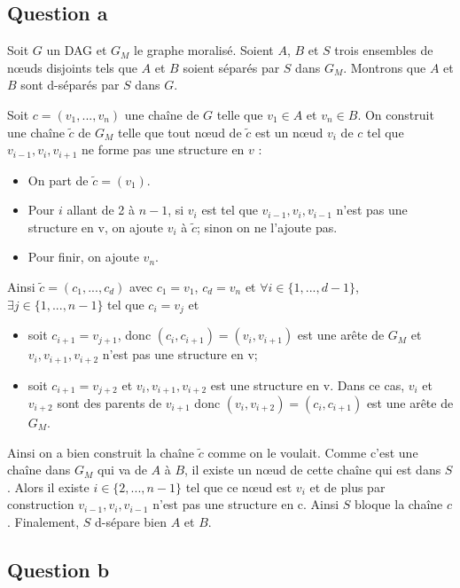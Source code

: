 \documentclass{article}
\begin{document}
\subsection{Question a}

Soit $G$ un DAG et $G_M$ le graphe moralisé. Soient $A$, $B$ et $S$ trois
ensembles de nœuds disjoints tels que $A$ et $B$ soient séparés par $S$ dans
$G_M$. Montrons que $A$ et $B$ sont d-séparés par $S$ dans $G$.

Soit $c = (v_{1}, ..., v_{n})$ une chaîne de $G$ telle que $v_{1} \in A$ et
$v_{n} \in B$. On construit une chaîne $\tilde{c}$ de $G_M$ telle que tout
nœud de $\tilde{c}$ est un nœud $v_i$ de $c$ tel que $v_{i-1},v_{i},v_{i+1}$
ne forme pas une structure en $v$ :

\begin{itemize}
  \item On part de $\tilde{c}=(v_{1})$.
  \item Pour  $i$ allant de 2 à $n-1$, si $v_i$ est tel que
  $v_{i-1},v_{i},v_{i-1}$ n'est pas une structure en v, on ajoute $v_i$ à
  $\tilde{c}$; sinon on ne l'ajoute pas.
  \item Pour finir, on ajoute $v_{n}$. 
\end{itemize}

Ainsi $\tilde{c} = (c_{1}, ..., c_{d})$ avec $c_1 = v_1$, $c_d = v_n$ et
$\forall i \in \{1,...,d-1\}$, $\exists j \in \{1,...,n-1\}$ tel que $c_i =
v_j$ et 

\begin{itemize}
  \item soit $c_{i+1} = v_{j+1}$, donc $(c_{i},c_{i+1})=(v_{i},v_{i+1})$ est
  une arête de $G_M$ et $v_{i},v_{i+1},v_{i+2}$ n'est pas une structure en v;
  \item soit $c_{i+1} = v_{j+2}$ et $v_{i},v_{i+1},v_{i+2}$ est une structure
  en v. Dans ce cas, $v_{i}$ et $v_{i+2}$ sont des parents de $v_{i+1}$ donc
  $(v_{i},v_{i+2})=(c_{i},c_{i+1})$ est une arête de $G_M$.
\end{itemize}

Ainsi on a bien construit la chaîne $\tilde{c}$ comme on le voulait. Comme
c'est une chaîne dans $G_M$ qui va de $A$ à $B$, il existe un nœud de cette
chaîne qui est dans $S$. Alors il existe $i\in \{2,...,n-1\}$ tel que ce nœud
est $v_i$ et de plus par construction $v_{i-1},v_{i},v_{i-1}$ n'est pas une
structure en c. Ainsi $S$ bloque la chaîne $c$. Finalement, $S$ d-sépare bien
$A$ et $B$.


\subsection{Question b}
\end{document}
